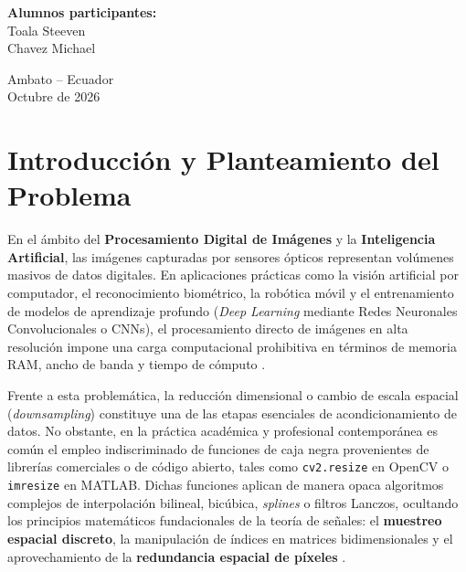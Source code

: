 \documentclass{article}
\begin{document}
\begin{titlepage}
\begin{center}
{        \vspace{0.45cm}

        \textbf{Alumnos participantes:}\\
        Toala Steeven\\
        Chavez Michael

        }

        \vfill

        {\large
        Ambato -- Ecuador\\
        Octubre de 2026
        }

    \end{center}

\end{titlepage}



\tableofcontents
\newpage

\listoffigures
\listoftables
\newpage



\section{Introducción y Planteamiento del Problema}

En el ámbito del \textbf{Procesamiento Digital de Imágenes} y la \textbf{Inteligencia Artificial}, las imágenes capturadas por sensores ópticos representan volúmenes masivos de datos digitales. En aplicaciones prácticas como la visión artificial por computador, el reconocimiento biométrico, la robótica móvil y el entrenamiento de modelos de aprendizaje profundo (\textit{Deep Learning} mediante Redes Neuronales Convolucionales o CNNs), el procesamiento directo de imágenes en alta resolución impone una carga computacional prohibitiva en términos de memoria RAM, ancho de banda y tiempo de cómputo \cite{szeliski2022computer}.

Frente a esta problemática, la reducción dimensional o cambio de escala espacial (\textit{downsampling}) constituye una de las etapas esenciales de acondicionamiento de datos. No obstante, en la práctica académica y profesional contemporánea es común el empleo indiscriminado de funciones de caja negra provenientes de librerías comerciales o de código abierto, tales como \texttt{cv2.resize} en OpenCV \cite{bradski2000opencv} o \texttt{imresize} en MATLAB. Dichas funciones aplican de manera opaca algoritmos complejos de interpolación bilineal, bicúbica, \textit{splines} o filtros Lanczos, ocultando los principios matemáticos fundacionales de la teoría de señales: el \textbf{muestreo espacial discreto}, la manipulación de índices en matrices bidimensionales y el aprovechamiento de la \textbf{redundancia espacial de píxeles} \cite{gonzalez2018digital}.
\end{document}
